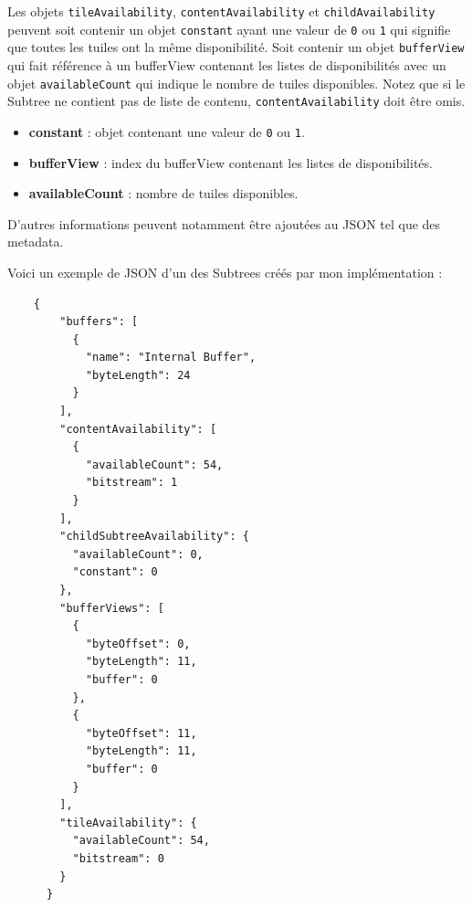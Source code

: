 Les objets \texttt{tileAvailability}, \texttt{contentAvailability} et \texttt{childAvailability} peuvent soit contenir un objet \texttt{constant} ayant une valeur de \texttt{0} ou \texttt{1} qui signifie que toutes les tuiles ont la même disponibilité. Soit contenir un objet \texttt{bufferView} qui fait référence à un bufferView contenant les listes de disponibilités avec un objet \texttt{availableCount} qui indique le nombre de tuiles disponibles. Notez que si le Subtree ne contient pas de liste de contenu, \texttt{contentAvailability} doit être omis.

\begin{itemize}
    \item \textbf{constant} : objet contenant une valeur de \texttt{0} ou \texttt{1}.
    \item \textbf{bufferView} : index du bufferView contenant les listes de disponibilités.
    \item \textbf{availableCount} : nombre de tuiles disponibles.
\end{itemize}

D'autres informations peuvent notamment être ajoutées au JSON tel que des metadata.

Voici un exemple de JSON d'un des Subtrees créés par mon implémentation :

\begin{verbatim}
    {
        "buffers": [
          {
            "name": "Internal Buffer",
            "byteLength": 24
          }
        ],
        "contentAvailability": [
          {
            "availableCount": 54,
            "bitstream": 1
          }
        ],
        "childSubtreeAvailability": {
          "availableCount": 0,
          "constant": 0
        },
        "bufferViews": [
          {
            "byteOffset": 0,
            "byteLength": 11,
            "buffer": 0
          },
          {
            "byteOffset": 11,
            "byteLength": 11,
            "buffer": 0
          }
        ],
        "tileAvailability": {
          "availableCount": 54,
          "bitstream": 0
        }
      }
\end{verbatim}